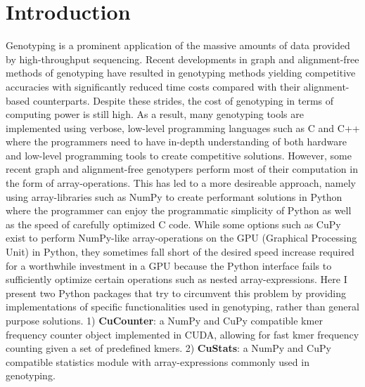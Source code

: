 \section*{Introduction}

Genotyping is a prominent application of the massive amounts of data provided by high-throughput sequencing. 
Recent developments in graph and alignment-free methods of genotyping have resulted in genotyping methods yielding competitive accuracies with significantly reduced time costs compared with their alignment-based counterparts.
Despite these strides, the cost of genotyping in terms of computing power is still high.
As a result, many genotyping tools are implemented using verbose, low-level programming languages such as C and C++ where the programmers need to have in-depth understanding of both hardware and low-level programming tools to create competitive solutions.
However, some recent graph and alignment-free genotypers perform most of their computation in the form of array-operations. 
This has led to a more desireable approach, namely using array-libraries such as NumPy \cite{numpy} to create performant solutions in Python where the programmer can enjoy the programmatic simplicity of Python as well as the speed of carefully optimized C code.
While some options such as CuPy \cite{cupy} exist to perform NumPy-like array-operations on the GPU (Graphical Processing Unit) in Python, they sometimes fall short of the desired speed increase required for a worthwhile investment in a GPU because the Python interface fails to sufficiently optimize certain operations such as nested array-expressions.
Here I present two Python packages that try to circumvent this problem by providing implementations of specific functionalities used in genotyping, rather than general purpose solutions.
1) \textbf{CuCounter}: a NumPy and CuPy compatible kmer frequency counter object implemented in CUDA, allowing for fast kmer frequency counting given a set of predefined kmers.
2) \textbf{CuStats}: a NumPy and CuPy compatible statistics module with array-expressions commonly used in genotyping.

